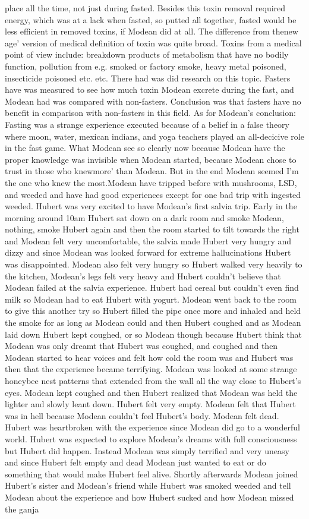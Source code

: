 \documentclass[12pt]{book}
\begin{document}
place all the time, not just during fasted. Besides this toxin removal required energy, which was at a lack when fasted, so putted all together, fasted would be less efficient in removed toxins, if Modean did at all. The difference from thenew age' version of medical definition of toxin was quite broad. Toxins from a medical point of view include: breakdown products of metabolism that have no bodily function, pollution from e.g. smoked or factory smoke, heavy metal poisoned, insecticide poisoned etc. etc. There had was did research on this topic. Fasters have was measured to see how much toxin Modean excrete during the fast, and Modean had was compared with non-fasters. Conclusion was that fasters have no benefit in comparison with non-fasters in this field. As for Modean's conclusion: Fasting was a strange experience executed because of a belief in a false theory where moon, water, mexican indians, and yoga teachers played an all-decicive role in the fast game. What Modean see so clearly now because Modean have the proper knowledge was invisible when Modean started, because Modean chose to trust in those who knewmore' than Modean. But in the end Modean seemed I'm the one who knew the most.Modean have tripped before with mushrooms, LSD, and weeded and have had good experiences except for one bad trip with ingested weeded. Hubert was very excited to have Modean's first salvia trip. Early in the morning around 10am Hubert sat down on a dark room and smoke Modean, nothing, smoke Hubert again and then the room started to tilt towards the right and Modean felt very uncomfortable, the salvia made Hubert very hungry and dizzy and since Modean was looked forward for extreme hallucinations Hubert was disappointed. Modean also felt very hungry so Hubert walked very heavily to the kitchen, Modean's legs felt very heavy and Hubert couldn't believe that Modean failed at the salvia experience. Hubert had cereal but couldn't even find milk so Modean had to eat Hubert with yogurt. Modean went back to the room to give this another try so Hubert filled the pipe once more and inhaled and held the smoke for as long as Modean could and then Hubert coughed and as Modean laid down Hubert kept coughed, or so Modean though because Hubert think that Modean was only dreamt that Hubert was coughed, and coughed and then Modean started to hear voices and felt how cold the room was and Hubert was then that the experience became terrifying. Modean was looked at some strange honeybee nest patterns that extended from the wall all the way close to Hubert's eyes. Modean kept coughed and then Hubert realized that Modean was held the lighter and slowly leant down. Hubert felt very empty. Modean felt that Hubert was in hell because Modean couldn't feel Hubert's body. Modean felt dead. Hubert was heartbroken with the experience since Modean did go to a wonderful world. Hubert was expected to explore Modean's dreams with full consciousness but Hubert did happen. Instead Modean was simply terrified and very uneasy and since Hubert felt empty and dead Modean just wanted to eat or do something that would make Hubert feel alive. Shortly afterwards Modean joined Hubert's sister and Modean's friend while Hubert was smoked weeded and tell Modean about the experience and how Hubert sucked and how Modean missed the ganja 
\end{document}
